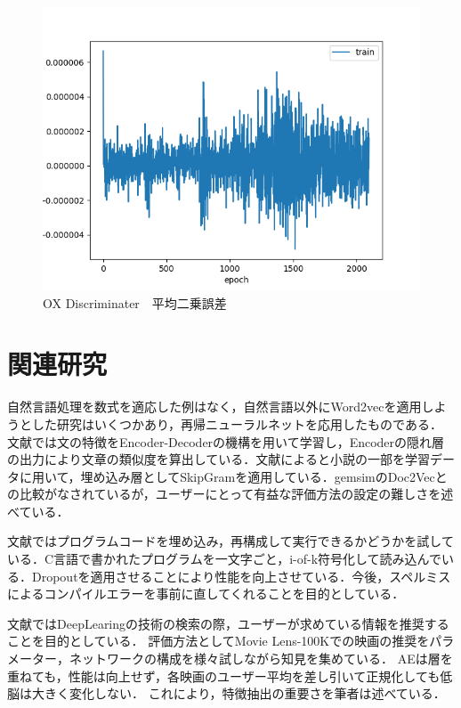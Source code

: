\documentclass[a4j,11pt,report]{jsbook}
\begin{document}
\begin{center}
  \begin{figure}[H]
    \centering
    \includegraphics[width=0.8\linewidth]{image/LOSSplot.png}
    \caption{OX Discriminater　平均二乗誤差　}
    \label{fig:OX_Discriminater_loss}
  \end{figure}
\end{center}
\clearpage








\chapter{関連研究\label{ch:relsatedwork}}
自然言語処理を数式を適応した例はなく，自然言語以外にWord2vecを適用しようとした研究はいくつかあり，再帰ニューラルネットを応用したものである．
文献\cite{kannrenn3}では文の特徴をEncoder-Decoderの機構を用いて学習し，Encoderの隠れ層の出力により文章の類似度を算出している．文献\cite{kannrenn3}によると小説の一部を学習データに用いて，埋め込み層としてSkipGramを適用している．gemsimのDoc2Vecとの比較がなされているが，ユーザーにとって有益な評価方法の設定の難しさを述べている．

文献\cite{lannrenn4}ではプログラムコードを埋め込み，再構成して実行できるかどうかを試している．C言語で書かれたプログラムを一文字ごと，i-of-k符号化して読み込んでいる．Dropoutを適用させることにより性能を向上させている．今後，スペルミスによるコンパイルエラーを事前に直してくれることを目的としている．

文献\cite{kannrenn5}ではDeepLearingの技術の検索の際，ユーザーが求めている情報を推奨することを目的としている．
評価方法としてMovie Lens-100Kでの映画の推奨をパラメーター，ネットワークの構成を様々試しながら知見を集めている．
AEは層を重ねても，性能は向上せず，各映画のユーザー平均を差し引いて正規化しても低脳は大きく変化しない．
これにより，特徴抽出の重要さを筆者は述べている．
\end{document}
